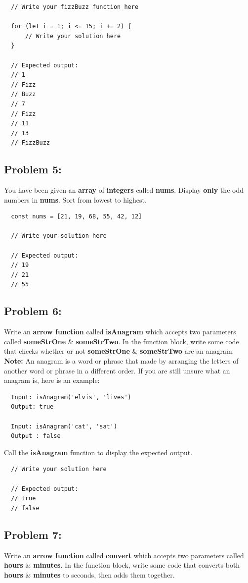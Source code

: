 \documentclass{article}
\begin{document}
\begin{verbatim}
  // Write your fizzBuzz function here

  for (let i = 1; i <= 15; i += 2) {
      // Write your solution here
  }

  // Expected output:
  // 1
  // Fizz 
  // Buzz
  // 7
  // Fizz
  // 11
  // 13
  // FizzBuzz
\end{verbatim}

\subsection*{Problem 5:}
You have been given an \textbf{array} of \textbf{integers} called \textbf{nums}. Display \textbf{only} the odd numbers in \textbf{nums}. Sort from lowest to highest.

\begin{verbatim}
  const nums = [21, 19, 68, 55, 42, 12]
        
  // Write your solution here

  // Expected output:
  // 19
  // 21
  // 55
\end{verbatim}

\subsection*{Problem 6:}
Write an \textbf{arrow function} called \textbf{isAnagram} which accepts two parameters called \textbf{someStrOne} \& \textbf{someStrTwo}. In the function block, write some code that checks whether or not \textbf{someStrOne} \& \textbf{someStrTwo} are an anagram. \textbf{Note:} An anagram is a word or phrase that made by arranging the letters of another word or phrase in a different order. If you are still unsure what an anagram is, here is an example:

\begin{verbatim}
  Input: isAnagram('elvis', 'lives')
  Output: true

  Input: isAnagram('cat', 'sat')
  Output : false
\end{verbatim}

Call the \textbf{isAnagram} function to display the expected output.

\begin{verbatim}
  // Write your solution here

  // Expected output:
  // true
  // false
\end{verbatim}

\subsection*{Problem 7:}
Write an \textbf{arrow function} called \textbf{convert} which accepts two parameters called \textbf{hours} \& \textbf{minutes}. In the function block, write some code that converts both \textbf{hours} \& \textbf{minutes} to seconds, then adds them together.
\end{document}
